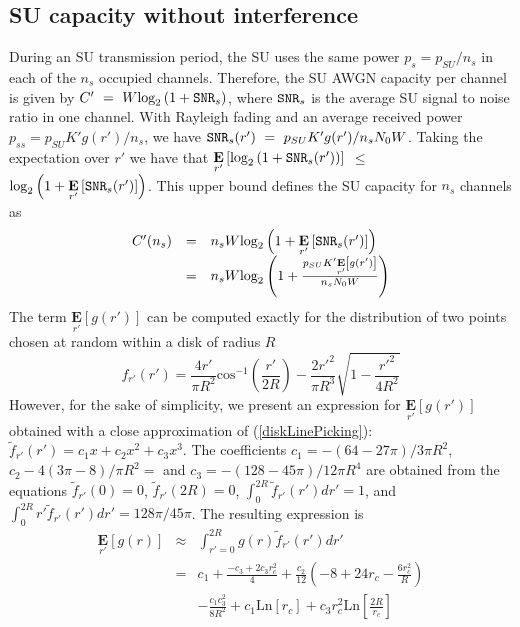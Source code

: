 \subsection{SU capacity without interference}
During an SU transmission period, the SU uses the same power $p_{s}=p_{SU}/n_{s}$ in each of the $n_{s}$ occupied channels. Therefore, the SU AWGN capacity per channel is given by $C'~=~W\text{log}_{2}\left(1+\text{\ttfamily{SNR}}_{s}\right)$, where $\text{\ttfamily{SNR}}_{s}$ is the average SU signal to noise ratio in one channel. With Rayleigh fading and an average received power $p_{ss}=p_{SU}K'g(r')/n_{s}$, we have $\text{\ttfamily{SNR}}_{s}(r')~=~p_{SU}K'g(r')/n_{s}N_{0}W$.
Taking the expectation over $r'$ we have that $\underset{r'}{\mathbf{E}}\left[\text{log}_{2}\left(1+\text{\ttfamily{SNR}}_{s}(r')\right)\right]$ $\leq$ $\text{log}_{2}\left(1+\underset{r'}{\mathbf{E}}\left[\text{\ttfamily{SNR}}_{s}(r')\right]\right)$. This upper bound defines the SU capacity for $n_{s}$ channels as
\begin{equation}
\begin{array}{lcl}
C'(n_{s}) & = & n_{s}W\text{log}_{2}\left(1+\underset{r'}{\mathbf{E}}\left[\text{\ttfamily{SNR}}_{s}(r')\right]\right)\\
&=& n_{s}W\text{log}_{2}\left(1+\frac{p_{SU}K'\underset{r'}{\mathbf{E}}\left[g(r')\right]}{n_{s}N_{0}W}\right)
\end{array}
\end{equation}
The term $\underset{r'}{\mathbf{E}}\left[g(r')\right]$ can be computed exactly for the distribution of two points chosen at random within a disk of radius $R$
\begin{equation}\label{diskLinePicking}
f_{r'}\left(r'\right) = \displaystyle\frac{4r'}{\pi R^{2}}\text{cos}^{-1}\left(\displaystyle\frac{r'}{2R}\right) - \displaystyle\frac{2r'^{2}}{\pi R^{3}}\sqrt{1-\displaystyle\frac{r'^{2}}{4R^{2}}}
\end{equation}
However, for the sake of simplicity, we present an expression for $\underset{r'}{\mathbf{E}}\left[g(r')\right]$ obtained with a close approximation of (\ref{diskLinePicking}): $\tilde{f}_{r'}\left(r'\right) = c_{1}x+c_{2}x^2+c_{3}x^{3}$. The coefficients $c_{1}=-(64-27\pi)/3\pi R^{2}$, $c_{2}-4(3\pi-8)/\pi R^{2}=$ and $c_{3}=-(128-45\pi)/12\pi R^{4}$ are obtained from the equations $\tilde{f}_{r'}(0)=0$, $\tilde{f}_{r'}(2R)=0$, $\int_{0}^{2R}\tilde{f}_{r'}(r')dr'=1$, and $\int_{0}^{2R}r'\tilde{f}_{r'}(r')dr'=128\pi/45\pi$. The resulting expression is
\begin{equation}\label{Egrprime}
\begin{array}{lcl}
\underset{r'}{\mathbf{E}}\left[g(r)\right] & \approx &  \displaystyle\int_{r'=0}^{2R}g(r)\tilde{f}_{r'}(r')dr'\\
& = & c_{1}+\frac{-c_{3}+2c_{3}r_{c}^{2}}{4} + \frac{c_{2}}{12}\left(-8+24r_{c}-\frac{6r_{c}^{2}}{R}\right)\\
&&-\frac{c_{1} c_{3}^{2}}{8 R^{2}}+c_{1}\text{Ln}[r_{c}]+c_{3} r_{c}^{2} \text{Ln}\left[\frac{2 R}{r_{c}}\right]
\end{array}
\end{equation}


